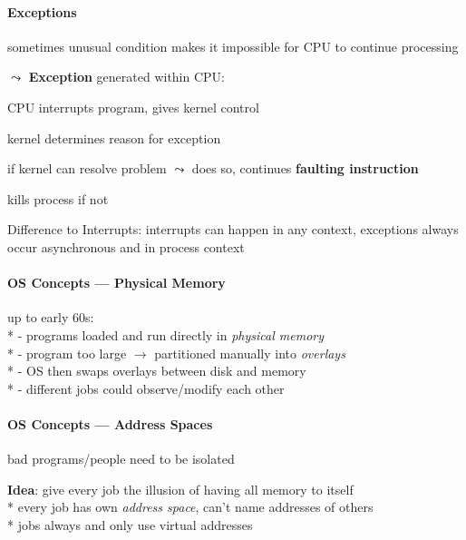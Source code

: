 \paragraph{Exceptions}
\begin{items}
	\item sometimes unusual condition makes it impossible for CPU to continue processing
	\item \( \leadsto \) \textbf{Exception} generated within CPU:
	\begin{enumeration}
		\item CPU interrupts program, gives kernel control
		\item kernel determines reason for exception
		\item if kernel can resolve problem \( \leadsto \) does so, continues \textbf{faulting instruction}
		\item kills process if not
	\end{enumeration}
	\item Difference to Interrupts: interrupts can happen in any context, exceptions always occur asynchronous and in process context
\end{items}

\paragraph{OS Concepts --- Physical Memory}
\begin{items}
	\item up to early 60s: \\* 
		- programs loaded and run directly in \emph{physical memory}
		\\*
		- program too large \( \to \) partitioned manually into \emph{overlays}
		\\*
		- OS then swaps overlays between disk and memory
		\\*
		- different jobs could observe/modify each other
\end{items}

\paragraph{OS Concepts --- Address Spaces}
\begin{items}
	\item bad programs/people need to be isolated
	\item \textbf{Idea}: give every job the illusion of having all memory to itself
		\\*
		every job has own \emph{address space}, can't name addresses of others
		\\*
		jobs always and only use virtual addresses
\end{items}

